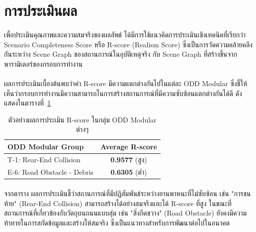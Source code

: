\section{การประเมินผล}
\paragraph{}
เพื่อประเมินคุณภาพและความสมจริงของผลลัพธ์ ได้มีการใช้แนวคิดการประเมินเชิงเทคนิคที่เรียกว่า Scenario Completeness Score หรือ R-score (Realism Score) ซึ่งเป็นการวัดความคล้ายคลึงกันระหว่าง Scene Graph ของสถานการณ์ในอุบัติเหตุจริง กับ Scene Graph ที่สร้างขึ้นจากพารามิเตอร์ของกรอบการทำงาน

\paragraph{}
ผลการประเมินเบื้องต้นพบว่าค่า R-score มีความแตกต่างกันไปในแต่ละ ODD Modular ซึ่งชี้ให้เห็นว่ากรอบการทำงานมีความสามารถในการสร้างสถานการณ์ที่มีความซับซ้อนแตกต่างกันได้ดี ดังแสดงในตารางที่~\ref{tab:r_score_results}

\begin{table}[htbp]
    \centering
    \caption{ตัวอย่างผลการประเมิน R-score ในกลุ่ม ODD Modular ต่างๆ}
    \label{tab:r_score_results}
    \begin{tabular}{|l|c|}
        \hline
        \rowcolor{gray!20} \textbf{ODD Modular Group} & \textbf{Average R-score} \\
        \hline
        T-1: Rear-End Collision & \textbf{0.9577} (สูง) \\
        \hline
        E-6: Road Obstacle - Debris & \textbf{0.6305} (ต่ำ) \\
        \hline
    \end{tabular}
\end{table}

\paragraph{}
จากตาราง ผลการประเมินชี้ว่าสถานการณ์ที่มีปฏิสัมพันธ์ระหว่างยานพาหนะที่ไม่ซับซ้อน เช่น "การชนท้าย" (Rear-End Collision) สามารถสร้างได้อย่างสมจริงและได้ R-score ที่สูง ในขณะที่สถานการณ์ที่เกี่ยวข้องกับวัตถุบนถนนแบบสุ่ม เช่น "สิ่งกีดขวาง" (Road Obstacle) ยังคงมีความท้าทายในการสกัดข้อมูลและสร้างให้สมจริง ซึ่งเป็นแนวทางสำหรับการพัฒนาต่อไปในอนาคต